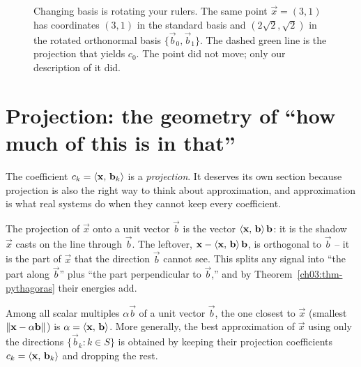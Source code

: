 \begin{figure}[H]
\centering
{}
\caption{Changing basis is rotating your rulers. The same point $\vec{x}=(3,1)$ has coordinates
$(3,1)$ in the standard basis and $(2\sqrt2,\sqrt2)$ in the rotated orthonormal basis
$\{\vec{b}_0,\vec{b}_1\}$. The dashed green line is the projection that yields $c_0$. The point did
not move; only our description of it did.}
\label{ch03:fig-basis-change}
\end{figure}

\section{Projection: the geometry of ``how much of this is in that''}
\label{ch03:projection}

The coefficient $c_k=\langle \mathbf{x},\, \mathbf{b}_k \rangle$ is a \emph{projection}. It deserves its own
section because projection is also the right way to think about approximation, and approximation is
what real systems do when they cannot keep every coefficient.

The projection of $\vec{x}$ onto a unit vector $\vec{b}$ is the vector
$\langle \mathbf{x},\, \mathbf{b} \rangle\,\mathbf{b}$: it is the shadow $\vec{x}$ casts on the line through $\vec{b}$.
The leftover, $\mathbf{x} - \langle \mathbf{x},\, \mathbf{b} \rangle\,\mathbf{b}$, is orthogonal to $\vec{b}$ -- it is the
part of $\vec{x}$ that the direction $\vec{b}$ cannot see. This splits any signal into ``the
part along $\vec{b}$'' plus ``the part perpendicular to $\vec{b}$,'' and by
Theorem~\ref{ch03:thm-pythagoras} their energies add.

\begin{theorem}
\label{ch03:thm-bestapprox}
Among all scalar multiples $\alpha\vec{b}$ of a unit vector $\vec{b}$, the one closest to $\vec{x}$
(smallest $\lVert\mathbf{x}-\alpha\mathbf{b}\rVert$) is $\alpha = \langle \mathbf{x},\, \mathbf{b} \rangle$. More generally, the
best approximation of $\vec{x}$ using only the directions $\{\vec{b}_k : k\in S\}$ is obtained by
keeping their projection coefficients $c_k=\langle \mathbf{x},\, \mathbf{b}_k \rangle$ and dropping the rest.
\end{theorem}

